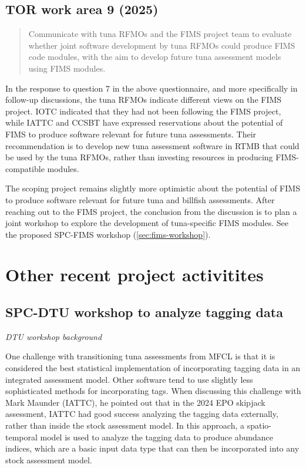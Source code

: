 \documentclass{SCreport}
\begin{document}
\vspace{2ex}

\hypertarget{link:tor-9}{}
\subsection{TOR work area 9 (2025)}
\label{sec:tor-9}

\begin{quote}\sf
  Communicate with tuna RFMOs and the FIMS project team to evaluate whether
  joint software development by tuna RFMOs could produce FIMS code modules, with
  the aim to develop future tuna assessment models using FIMS modules.
\end{quote}

\vspace{2ex}

In the response to question 7 in the above questionnaire, and more specifically
in follow-up discussions, the tuna RFMOs indicate different views on the FIMS
project. IOTC indicated that they had not been following the FIMS project, while
IATTC and CCSBT have expressed reservations about the potential of FIMS to
produce software relevant for future tuna assessments. Their recommendation is
to develop new tuna assessment software in RTMB that could be used by the tuna
RFMOs, rather than investing resources in producing FIMS-compatible modules.

The scoping project remains slightly more optimistic about the potential of FIMS
to produce software relevant for future tuna and billfish assessments. After
reaching out to the FIMS project, the conclusion from the discussion is to plan
a joint workshop to explore the development of tuna-specific FIMS modules. See
the proposed SPC-FIMS workshop (\autoref{sec:fims-workshop}).

\vspace{2ex}

\section{Other recent project activitites}

\subsection{SPC-DTU workshop to analyze tagging data}
\label{sec:dtu-2025-workshop}

\textit{DTU workshop background}

One challenge with transitioning tuna assessments from MFCL is that it is
considered the best statistical implementation of incorporating tagging data in
an integrated assessment model. Other software tend to use slightly less
sophisticated methods for incorporating tags. When discussing this challenge
with Mark Maunder (IATTC), he pointed out that in the 2024 EPO skipjack
assessment, IATTC had good success analyzing the tagging data externally, rather
than inside the stock assessment model. In this approach, a spatio-temporal
model is used to analyze the tagging data to produce abundance indices, which
are a basic input data type that can then be incorporated into any stock
assessment model.
\end{document}
